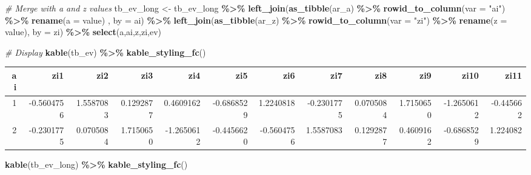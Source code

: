 \documentclass[
]{book}
\newenvironment{Shaded}{\begin{snugshade}}{\end{snugshade}}
\newcommand{\CommentTok}[1]{\textcolor[rgb]{0.56,0.35,0.01}{\textit{#1}}}
\newcommand{\DataTypeTok}[1]{\textcolor[rgb]{0.13,0.29,0.53}{#1}}
\newcommand{\KeywordTok}[1]{\textcolor[rgb]{0.13,0.29,0.53}{\textbf{#1}}}
\newcommand{\NormalTok}[1]{#1}
\newcommand{\OperatorTok}[1]{\textcolor[rgb]{0.81,0.36,0.00}{\textbf{#1}}}
\newcommand{\StringTok}[1]{\textcolor[rgb]{0.31,0.60,0.02}{#1}}
\begin{document}
\begin{Shaded}
\begin{Highlighting}[]
\CommentTok{\# Merge with a and z values}
\NormalTok{tb\_ev\_long \textless{}{-}}\StringTok{ }\NormalTok{tb\_ev\_long }\OperatorTok{\%\textgreater{}\%}
\StringTok{  }\KeywordTok{left\_join}\NormalTok{(}\KeywordTok{as\_tibble}\NormalTok{(ar\_a) }\OperatorTok{\%\textgreater{}\%}
\StringTok{              }\KeywordTok{rowid\_to\_column}\NormalTok{(}\DataTypeTok{var =} \StringTok{"ai"}\NormalTok{) }\OperatorTok{\%\textgreater{}\%}
\StringTok{              }\KeywordTok{rename}\NormalTok{(}\DataTypeTok{a =}\NormalTok{ value)}
\NormalTok{              , }\DataTypeTok{by =} \StringTok{\textquotesingle{}ai\textquotesingle{}}\NormalTok{) }\OperatorTok{\%\textgreater{}\%}
\StringTok{  }\KeywordTok{left\_join}\NormalTok{(}\KeywordTok{as\_tibble}\NormalTok{(ar\_z) }\OperatorTok{\%\textgreater{}\%}
\StringTok{              }\KeywordTok{rowid\_to\_column}\NormalTok{(}\DataTypeTok{var =} \StringTok{"zi"}\NormalTok{) }\OperatorTok{\%\textgreater{}\%}
\StringTok{              }\KeywordTok{rename}\NormalTok{(}\DataTypeTok{z =}\NormalTok{ value),}
            \DataTypeTok{by =} \StringTok{\textquotesingle{}zi\textquotesingle{}}\NormalTok{) }\OperatorTok{\%\textgreater{}\%}
\StringTok{  }\KeywordTok{select}\NormalTok{(a,ai,z,zi,ev)}

\CommentTok{\# Display}
\KeywordTok{kable}\NormalTok{(tb\_ev) }\OperatorTok{\%\textgreater{}\%}\StringTok{ }\KeywordTok{kable\_styling\_fc}\NormalTok{()}
\end{Highlighting}
\end{Shaded}

\begin{table}[!h]
\centering
\begin{tabular}{r|r|r|r|r|r|r|r|r|r|r|r}
\hline
ai & zi1 & zi2 & zi3 & zi4 & zi5 & zi6 & zi7 & zi8 & zi9 & zi10 & zi11\\
\hline
\rowcolor{gray!6}  1 & -0.5604756 & 1.5587083 & 0.1292877 & 0.4609162 & -0.6868529 & 1.2240818 & -0.2301775 & 0.0705084 & 1.7150650 & -1.2650612 & -0.445662\\
\hline
2 & -0.2301775 & 0.0705084 & 1.7150650 & -1.2650612 & -0.4456620 & -0.5604756 & 1.5587083 & 0.1292877 & 0.4609162 & -0.6868529 & 1.224082\\
\hline
\end{tabular}
\end{table}

\begin{Shaded}
\begin{Highlighting}[]
\KeywordTok{kable}\NormalTok{(tb\_ev\_long) }\OperatorTok{\%\textgreater{}\%}\StringTok{ }\KeywordTok{kable\_styling\_fc}\NormalTok{()}
\end{Highlighting}
\end{Shaded}
\end{document}
